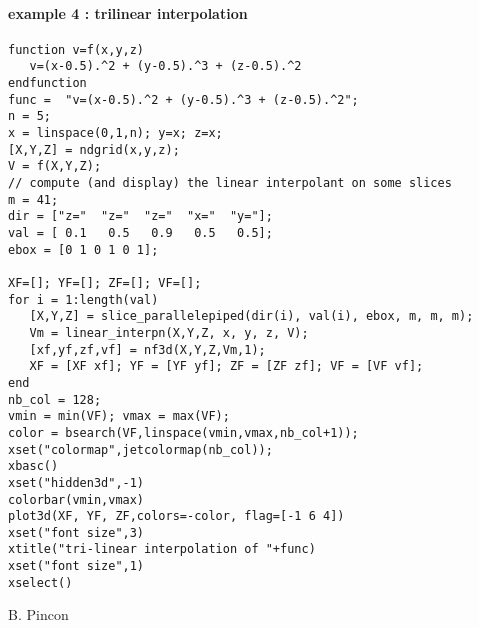 \begin{examples}
\paragraph{example 4 : trilinear interpolation}
\begin{Verbatim}
function v=f(x,y,z)
   v=(x-0.5).^2 + (y-0.5).^3 + (z-0.5).^2
endfunction
func =  "v=(x-0.5).^2 + (y-0.5).^3 + (z-0.5).^2";
n = 5; 
x = linspace(0,1,n); y=x; z=x;
[X,Y,Z] = ndgrid(x,y,z);
V = f(X,Y,Z);
// compute (and display) the linear interpolant on some slices
m = 41;
dir = ["z="  "z="  "z="  "x="  "y="];
val = [ 0.1   0.5   0.9   0.5   0.5];
ebox = [0 1 0 1 0 1];

XF=[]; YF=[]; ZF=[]; VF=[];
for i = 1:length(val)
   [X,Y,Z] = slice_parallelepiped(dir(i), val(i), ebox, m, m, m);
   Vm = linear_interpn(X,Y,Z, x, y, z, V);
   [xf,yf,zf,vf] = nf3d(X,Y,Z,Vm,1);
   XF = [XF xf]; YF = [YF yf]; ZF = [ZF zf]; VF = [VF vf]; 
end
nb_col = 128;
vmin = min(VF); vmax = max(VF);
color = bsearch(VF,linspace(vmin,vmax,nb_col+1));
xset("colormap",jetcolormap(nb_col));
xbasc()
xset("hidden3d",-1)
colorbar(vmin,vmax)
plot3d(XF, YF, ZF,colors=-color, flag=[-1 6 4])
xset("font size",3)
xtitle("tri-linear interpolation of "+func)
xset("font size",1)
xselect()
\end{Verbatim}
 
\end{examples}


\begin{manseealso}
 
\end{manseealso}


\begin{authors}
  B. Pincon
\end{authors}


